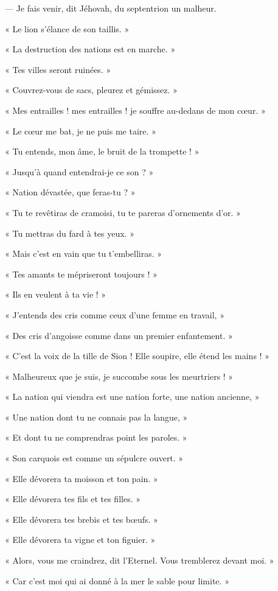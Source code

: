 \documentclass[a4paper, 11pt, oneside, polutonikogreek, french]{article}
\begin{document}
--- Je fais venir, dit Jéhovah, du septentrion un malheur.

« Le lion s'élance de son taillis. »

« La destruction des nations est en marche. »

« Tes villes seront ruinées. »

« Couvrez-vous de sacs, pleurez et gémissez. »

« Mes entrailles ! mes entrailles ! je souffre au-dedans de mon cœur. »

« Le cœur me bat, je ne puis me taire. »

« Tu entends, mon âme, le bruit de la trompette ! »

« Jusqu'à quand entendrai-je ce son ? »

« Nation dévastée, que feras-tu ? »

« Tu te revêtiras de cramoisi, tu te pareras d'ornements d'or. »

« Tu mettras du fard à tes yeux. »

« Mais c'est en vain que tu t'embelliras. »

« Tes amants te mépriseront toujours ! »

« Ils en veulent à ta vie ! »

« J'entends des cris comme ceux d'une femme en travail, »

« Des cris d'angoisse comme dans un premier enfantement. »

« C'est la voix de la tille de Sion ! Elle soupire, elle étend les mains ! »

« Malheureux que je suis, je succombe sous les meurtriers ! »

« La nation qui viendra est une nation forte, une nation ancienne, »

« Une nation dont tu ne connais pas la langue, »

« Et dont tu ne comprendras point les paroles. »

« Son carquois est comme un sépulcre ouvert. »

« Elle dévorera ta moisson et ton pain. »

« Elle dévorera tes fils et tes filles. »

« Elle dévorera tes brebis et tes bœufs. »

« Elle dévorera ta vigne et ton figuier. »

« Alors, vous me craindrez, dit l'Eternel. Vous tremblerez devant moi. »

« Car c'est moi qui ai donné à la mer le sable pour limite. »
\end{document}
